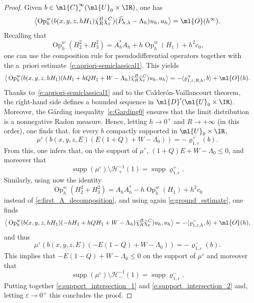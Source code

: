 \documentclass[JEP,XML,SOM,Unicode, NoEqCountersInSection,published]{cedram}
\theoremstyle{plain}
\theoremstyle{definition}
\theoremstyle{remark}
\newcommand{\Op}{\operatorname{Op}}
\begin{document}
\begin{proof} Given $b\in\ml{C}^{\infty}_c(\ml{U}_0\times\IR)$, one has
\begin{equation}
\label{e:ground_estimate}
\bigl\langle \Op_h^w(b(x,y,z,hH_1)\tilde{\chi}_R^B\tilde{\chi}_\varepsilon^C)(\widehat{P}_{h,\lambda}-\Lambda_h)u_h,u_h\bigr\rangle=\ml{O}(h^\infty).
\end{equation}
Recalling that
\begin{equation}
\label{e:first_A_decomposition}
\Op_h^w(H^2_2+H_3^2)=A_h^*A_h+h\Op_h^w(H_1) + h^2c_0,
\end{equation}
one can use the composition rule for pseudodifferential operators together with the a~priori estimate~\eqref{e:apriori-semiclassical1}. This yields
\[
\big \langle \Op_h^w(b(x,y,z,hH_1)(hH_1+hQH_1+W-\Lambda_h)\tilde{\chi}_R^B\tilde{\chi}_\varepsilon^C)u_h,u_h\big \rangle = - \langle \varrho^+_{1,\varepsilon,R,h} , b \rangle + \ml{O}(h).
\]
Thanks to~\eqref{e:apriori-semiclassical1} and to the Calderón-Vaillancourt theorem, the right-hand side defines a bounded sequence in $\ml{D}'(\ml{U}_0\times\IR)$. Moreover, the G\aa rding inequality~\eqref{e:Garding0} ensures that the limit distribution is a nonnegative Radon measure. Hence, letting $h\to 0^+$ and $R\to+\infty$ (in this order), one finds that, for every $b$ compactly supported in $\ml{U}_0\times\IR$,
\[
\mu^\varepsilon\left(b(x,y,z,E)(E(1+Q)+W-\Lambda_0)\right)= - \varrho^+_{1,\varepsilon}(b).
\]
From this, one infers that, on the support of $\mu^\varepsilon$, $(1+Q)E + W - \Lambda_0 \leq 0$, and moreover that
\begin{equation}
\label{e:support_intersection_1}
\operatorname{supp}(\mu^\varepsilon) \setminus \mathcal{H}_+^{-1}(1) = \operatorname{supp} \varrho^+_{1,\varepsilon} .
\end{equation}
Similarly, using now the identity
\begin{equation}
\label{e:second_A_decomposition}
\Op_h^w(H^2_2+H_3^2)=A_h A_h^* - h\Op_h^w(H_1) + h^2 c_0
\end{equation}
instead of \eqref{e:first_A_decomposition}, and using again \eqref{e:ground_estimate}, one finds
\[
\big \langle \Op_h^w(b(x,y,z,hH_1)(-hH_1+hQH_1+W-\Lambda_h)\tilde{\chi}_R^B\tilde{\chi}_\varepsilon^C)u_h,u_h\big \rangle = - \langle \varrho_{1,\varepsilon,h}^- , b \rangle + \ml{O}(h),
\]
and thus
\[
\mu^\varepsilon\left(b(x,y,z,E)(-E(1-Q)+W-\Lambda_0)\right)= - \varrho^-_{1,\varepsilon}(b).
\]
This implies that $-E(1-Q) + W - \Lambda_0 \leq 0$ on the support of $\mu^\varepsilon$ and moreover that
\begin{equation}
\label{e:support_intersection_2}
\operatorname{supp}(\mu^\varepsilon) \setminus \mathcal{H}_-^{-1}(1) = \operatorname{supp} \varrho^-_{1,\varepsilon} .
\end{equation}
Putting together \eqref{e:support_intersection_1} and \eqref{e:support_intersection_2} and, letting $\varepsilon\to 0^+$ this concludes the proof.
\end{proof}
\end{document}
